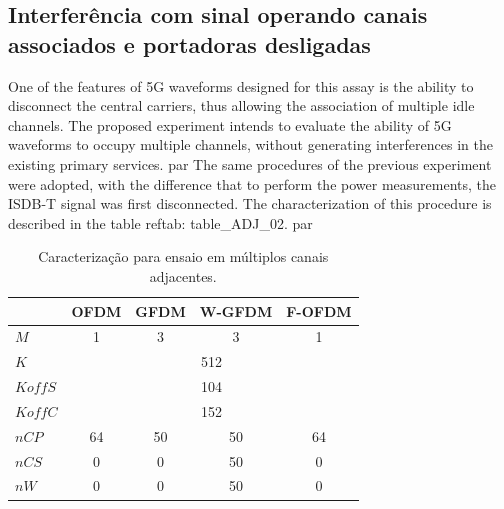 

\subsection{Interferência com sinal operando canais associados e portadoras desligadas}

One of the features of 5G waveforms designed for this assay is the ability to disconnect the central carriers, thus allowing the association of multiple idle channels. The proposed experiment intends to evaluate the ability of 5G waveforms to occupy multiple channels, without generating interferences in the existing primary services. par%
The same procedures of the previous experiment were adopted, with the difference that to perform the power measurements, the ISDB-T signal was first disconnected. The characterization of this procedure is described in the table ref{tab: table_ADJ_02}. par

\begin{table}[h!]
	\begin{center}
		\centering
		\caption{Caracterização para ensaio em múltiplos canais adjacentes.}
		\label{tab:table_ADJ_02}
		\begin{tabular}{|l|c|c|c|c|}
			\hline
			\textbf{} & \textbf{OFDM} & \textbf{GFDM} & \textbf{W-GFDM} & \textbf{F-OFDM}\\
			\hline
			$M$ & 1 & 3 & 3 & 1\\
			\hline
			$K$ &\multicolumn{4}{c|}{512}\\
			\hline
			$KoffS$ &\multicolumn{4}{c|}{104}\\ 
			\hline
			$KoffC$ &\multicolumn{4}{c|}{152}\\ 
			\hline
			$nCP$ & 64 & 50 & 50 & 64\\
			\hline
			$nCS$ & 0 & 0 & 50 & 0\\
			\hline
			$nW$ & 0 & 0 & 50 & 0\\
			\hline
		\end{tabular}
	\end{center}
\end{table}

